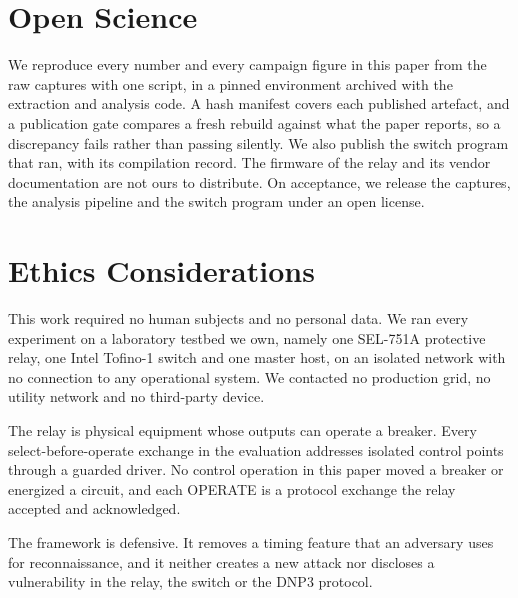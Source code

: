 \section*{Open Science}

We reproduce every number and every campaign figure in this paper from the raw captures with one
script, in a pinned environment archived with the extraction and analysis code. A hash manifest
covers each published artefact, and a publication gate compares a fresh rebuild against what the
paper reports, so a discrepancy fails rather than passing silently. We also publish the switch
program that ran, with its compilation record. The firmware of the relay and its vendor
documentation are not ours to distribute. On acceptance, we release the captures, the analysis
pipeline and the switch program under an open license.

\section*{Ethics Considerations}

This work required no human subjects and no personal data. We ran every experiment on a laboratory
testbed we own, namely one SEL-751A protective relay, one Intel Tofino-1 switch and one master
host, on an isolated network with no connection to any operational system. We contacted no
production grid, no utility network and no third-party device.

The relay is physical equipment whose outputs can operate a breaker. Every select-before-operate
exchange in the evaluation addresses isolated control points through a guarded driver. No
control operation in this paper moved a breaker or energized a circuit, and each OPERATE is a
protocol exchange the relay accepted and acknowledged.

The framework is defensive. It removes a timing feature that an adversary uses for reconnaissance,
and it neither creates a new attack nor discloses a vulnerability in the relay, the switch or the
DNP3 protocol.

